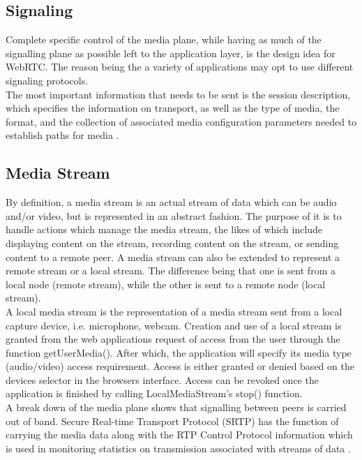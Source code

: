 \subsection{Signaling}
Complete specific control of the media plane, while having as much of the signalling plane as possible left to the application layer, is the design idea for WebRTC. The reason being the a variety of applications may opt to use different signaling protocols.
\\ The most important information that needs to be sent is the session description, which specifies the information on transport, as well as the type of media, the format, and the collection of associated media configuration parameters needed to establish paths for media \cite{loreto2014real}.

\subsection{Media Stream}
By definition, a media stream is an actual stream of data which can be audio and/or video, but is represented in an abstract fashion. The purpose of it is to handle actions which manage the media stream, the likes of which include displaying content on the stream, recording content on the stream, or sending content to a remote peer. A media stream can also be extended to represent a remote stream or a local stream. The difference being that one is sent from a local node (remote stream), while the other is sent to a remote node (local stream).
\\ A local media stream is the representation of a media stream sent from a local capture device, i.e. microphone, webcam. Creation and use of a local stream is granted from the web applications request of access from the user through the function getUserMedia(). After which, the application will specify its media type (audio/video) access requirement. Access is either granted or denied based on the devices selector in the browsers interface. Access can be revoked once the application is finished by calling LocalMediaStream’s stop() function.
\\  A break down of the media plane shows that signalling between peers is carried out of band. Secure Real-time Transport Protocol (SRTP) has the function of carrying the media data along with the RTP Control Protocol information which is used in monitoring statistics on transmission associated with streams of data \cite{loreto2014real}.

